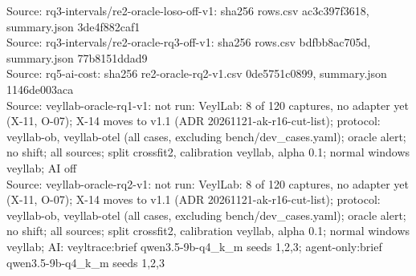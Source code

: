 \begin{table}[t]
Source: rq3-intervals/re2-oracle-loso-off-v1: sha256 rows.csv ac3c397f3618, summary.json 3de4f882caf1\\
Source: rq3-intervals/re2-oracle-rq3-off-v1: sha256 rows.csv bdfbb8ac705d, summary.json 77b8151ddad9\\
Source: rq5-ai-cost: sha256 re2-oracle-rq2-v1.csv 0de5751c0899, summary.json 1146de003aca\\
Source: veyllab-oracle-rq1-v1: not run: VeylLab: 8 of 120 captures, no adapter yet (X-11, O-07); X-14 moves to v1.1 (ADR 20261121-ak-r16-cut-list); protocol: veyllab-ob, veyllab-otel (all cases, excluding bench/dev\_cases.yaml); oracle alert; no shift; all sources; split crossfit2, calibration veyllab, alpha 0.1; normal windows veyllab; AI off\\
Source: veyllab-oracle-rq2-v1: not run: VeylLab: 8 of 120 captures, no adapter yet (X-11, O-07); X-14 moves to v1.1 (ADR 20261121-ak-r16-cut-list); protocol: veyllab-ob, veyllab-otel (all cases, excluding bench/dev\_cases.yaml); oracle alert; no shift; all sources; split crossfit2, calibration veyllab, alpha 0.1; normal windows veyllab; AI: veyltrace:brief qwen3.5-9b-q4\_k\_m seeds 1,2,3; agent-only:brief qwen3.5-9b-q4\_k\_m seeds 1,2,3\\
\end{table}
